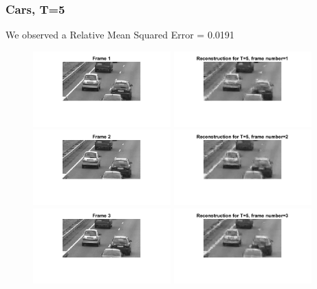 \documentclass[a4paper,11pt]{article}
\numberwithin{definition}{section}
\numberwithin{mytheorem}{subsection}
\begin{document}
\newpage

\subsubsection{Cars, T=5}

We observed a Relative Mean Squared Error = 0.0191


\begin{figure}[H]
    \centering
    \includegraphics[width=200px]{"Frame 1.png"}
    \includegraphics[width=200px]{"Reconstruction- T=5, frame number=1.png"}
    \includegraphics[width=200px]{"Frame 2.png"}
    \includegraphics[width=200px]{"Reconstruction- T=5, frame number=2.png"}
    \includegraphics[width=200px]{"Frame 3.png"}
    \includegraphics[width=200px]{"Reconstruction- T=5, frame number=3.png"}

\end{figure}
\end{document}

